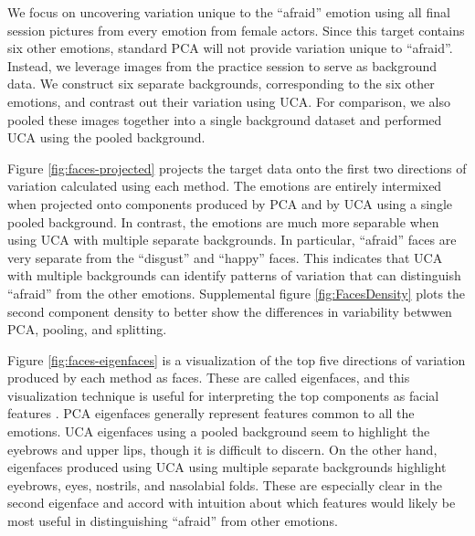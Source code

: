 \documentclass[10pt]{article}
\begin{document}
We focus on uncovering variation unique to the ``afraid'' emotion using all final session pictures from every emotion from female actors. Since this target contains six other emotions, standard PCA will not provide variation unique to ``afraid''. Instead, we leverage images from the practice session to serve as background data. We construct six separate backgrounds, corresponding to the six other emotions, and contrast out their variation using UCA. For comparison, we also pooled these images together into a single background dataset and performed UCA using the pooled background.

Figure \ref{fig:faces-projected} projects the target data onto the first two directions of variation calculated using each method. The emotions are entirely intermixed when projected onto components produced by PCA and by UCA using a single pooled background. In contrast, the emotions are much more separable when using UCA with multiple separate backgrounds. In particular, ``afraid'' faces are very separate from the ``disgust'' and ``happy'' faces. This indicates that UCA with multiple backgrounds can identify patterns of variation that can distinguish ``afraid'' from the other emotions. Supplemental figure \ref{fig:FacesDensity} plots the second component density to better show the differences in variability betwwen PCA, pooling, and splitting.

Figure \ref{fig:faces-eigenfaces} is a visualization of the top five directions of variation produced by each method as faces. These are called eigenfaces, and this visualization technique is useful for interpreting the top components as facial features \cite{turk1991eigenfaces}. PCA eigenfaces generally represent features common to all the emotions. UCA eigenfaces using a pooled background seem to highlight the eyebrows and upper lips, though it is difficult to discern. On the other hand, eigenfaces produced using UCA using multiple separate backgrounds highlight eyebrows, eyes, nostrils, and nasolabial folds. These are especially clear in the second eigenface and accord with intuition about which features would likely be most useful in distinguishing ``afraid'' from other emotions.



\end{document}
